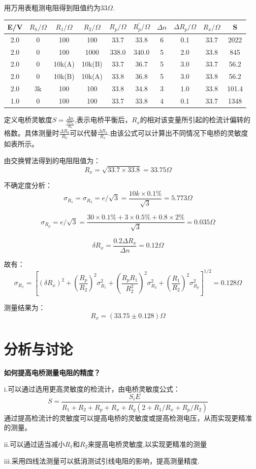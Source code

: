 \documentclass[a4paper, 10pt]{article}
\begin{document}
\noindent 用万用表粗测电阻得到阻值约为$33\Omega$.
\begin{center}
    \begin{tabular}{|c|c|c|c|c|c|c|c|c|c|}
      \hline
      E/V&$R_h/\Omega$& $R_1/\Omega$ & $R_2/\Omega$ & $R_p/\Omega$&$R_p^\prime/\Omega$&$\Delta n$&$\Delta R_p/\Omega$&$R_x/\Omega$&S\\
      \hline
      2.0 &0 &100&100&33.7&33.8&6&0.1&33.7&2022\\
      \hline
      2.0 &0&100&1000&338.0&340.0&5&2.0&33.8&845\\
      \hline
      2.0 &0 &10k(A)&10k(B)&33.7&36.7&5&3.0&33.7&56.2\\
      \hline
      2.0 &0 &10k(B)&10k(A)&33.8&36.8&5&3.0&33.8&56.2\\
      \hline
      2.0 &3k &100&100&33.8&34.8&3&1.0&33.8&101.4\\
      \hline
      1.0 &0&100 &100&33.7&33.8&4&0.1&33.7&1348\\
      \hline
      

    \end{tabular}
  \end{center}

\noindent 定义电桥灵敏度$S=\frac{\Delta n}{\frac{\Delta R_x}{R_x}}$,表示电桥平衡后，$R_x$的相对该变量所引起的检流计偏转的格数。具体测量时$\frac{\Delta R_0}{R_0}$可以代替$\frac{\Delta R_x}{R_x}$.由该公式可以计算出不同情况下电桥的灵敏度如表所示。

\noindent  由交换臂法得到的电阻阻值为：
$$R_x=\sqrt{33.7\times 33.8}=33.75\Omega$$

\noindent 不确定度分析：
$$\sigma_{R_1}=\sigma_{R_2}=e/\sqrt{3}=\frac{10k\times 0.1\%}{\sqrt{3}}=5.773\Omega$$

$$\sigma_{R_p}=e/\sqrt{3}=\frac{30\times 0.1\%+3\times 0.5\%+0.8\times 2\%}{\sqrt{3}}=0.035\Omega$$

$$\delta R_x=\frac{0.2\Delta R_x}{\Delta n}=0.12\Omega$$

\noindent 故有：
$$\sigma_{R_x}=[(\delta R_x)^2+(\frac{R_p}{R_2})^2\sigma_{R_1}^2+(\frac{R_pR_1}{R_2^2})^2\sigma_{R_2}^2+(\frac{R_1}{R_2})^2\sigma_{R_p}^2]^{1/2}=0.128\Omega$$

\noindent 测量结果为：
$$R_x=(33.75\pm0.128)\Omega$$

\section{分析与讨论}
\noindent \textbf{如何提高电桥测量电阻的精度？}

\noindent i.可以通过选用更高灵敏度的检流计，由电桥灵敏度公式：
$$S=\frac{S_iE}{R_1+R_2+R_p+R_x+R_g(2+R_1/R_x+R_p/R_2)}$$
通过提高检流计的灵敏度可以提高电桥的灵敏度或提高检测电压，从而实现更精准的测量。

\noindent ii.可以通过适当减小$R_1$和$R_2$来提高电桥灵敏度,以实现更精准的测量

\noindent iii.采用四线法测量可以抵消测试引线电阻的影响，提高测量精度.
\end{document}
